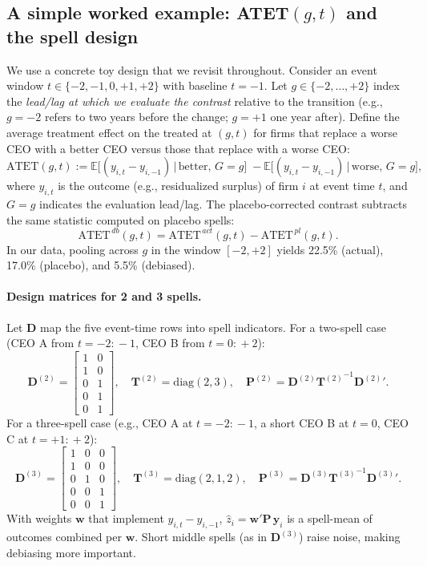 \documentclass[11pt,a4paper]{article}
\begin{document}
\subsection*{A simple worked example: ATET$(g,t)$ and the spell design}
We use a concrete toy design that we revisit throughout. Consider an event window $t\in\{-2,-1,0,+1,+2\}$ with baseline $t=-1$. Let $g\in\{-2,\ldots,+2\}$ index the \emph{lead/lag at which we evaluate the contrast} relative to the transition (e.g., $g=-2$ refers to two years before the change; $g=+1$ one year after). Define the average treatment effect on the treated at $(g,t)$ for firms that replace a worse CEO with a better CEO versus those that replace with a worse CEO:
\begin{equation*}
\text{ATET}(g,t) := \mathbb E\big[(y_{i,t}-y_{i,-1})\,\big|\,\text{better},\,G=g\big]
\;-
\mathbb E\big[(y_{i,t}-y_{i,-1})\,\big|\,\text{worse},\,G=g\big],
\end{equation*}
where $y_{i,t}$ is the outcome (e.g., residualized surplus) of firm $i$ at event time $t$, and $G=g$ indicates the evaluation lead/lag. The placebo-corrected contrast subtracts the same statistic computed on placebo spells:
\begin{equation*}
\text{ATET}^{\,db}(g,t) = \text{ATET}^{\,act}(g,t) - \text{ATET}^{\,pl}(g,t).
\end{equation*}
In our data, pooling across $g$ in the window $[-2,+2]$ yields 22.5\% (actual), 17.0\% (placebo), and 5.5\% (debiased).

\paragraph{Design matrices for 2 and 3 spells.} Let $\mathbf D$ map the five event-time rows into spell indicators. For a two-spell case (CEO A from $t=-2\!:\!-1$, CEO B from $t=0\!:\!+2$):
\[
\mathbf D^{(2)} =
\begin{bmatrix}
1 & 0\\
1 & 0\\
0 & 1\\
0 & 1\\
0 & 1
\end{bmatrix},\quad
\mathbf T^{(2)}=\mathrm{diag}(2,3),\quad
\mathbf P^{(2)}=\mathbf D^{(2)}{\mathbf T^{(2)}}^{-1}{\mathbf D^{(2)}}'.
\]
For a three-spell case (e.g., CEO A at $t=-2\!:\!-1$, a short CEO B at $t=0$, CEO C at $t=+1\!:\!+2$):
\[
\mathbf D^{(3)} =
\begin{bmatrix}
1 & 0 & 0\\
1 & 0 & 0\\
0 & 1 & 0\\
0 & 0 & 1\\
0 & 0 & 1
\end{bmatrix},\quad
\mathbf T^{(3)}=\mathrm{diag}(2,1,2),\quad
\mathbf P^{(3)}=\mathbf D^{(3)}{\mathbf T^{(3)}}^{-1}{\mathbf D^{(3)}}'.
\]
With weights $\mathbf w$ that implement $y_{i,t}-y_{i,-1}$, $\hat z_i=\mathbf w'\mathbf P\,\mathbf y_i$ is a spell-mean of outcomes combined per $\mathbf w$. Short middle spells (as in $\mathbf D^{(3)}$) raise noise, making debiasing more important.
\end{document}
